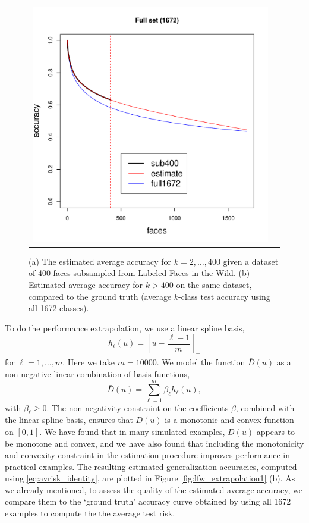 \documentclass[12pt]{article}
\begin{document}
\begin{figure}
\begin{tabular}{cc}
\includegraphics[scale = 0.5]{acc_plot2.pdf}
\end{tabular}
\caption{(a) The estimated average accuracy for $k = 2,\hdots,
  400$ given a dataset of 400 faces subsampled from Labeled Faces in
  the Wild.  (b) Estimated average accuracy for $k > 400$ on the
  same dataset, compared to the ground truth (average $k$-class test accuracy
  using all 1672 classes).}
\label{fig:lfw_extrapolation1}
\end{figure}

To do the performance extrapolation, we use a linear
spline basis,
\[
h_\ell(u) = \left[u - \frac{\ell - 1}{m}\right]_+
\]
for $\ell = 1,\hdots, m$.  Here we take $m = 10000$.  We model the
function $\bar{D}(u)$ as a non-negative linear combination of basis
functions,
\[
\bar{D}(u) = \sum_{\ell = 1}^m \beta_\ell h_\ell(u),
\]
with $\beta_\ell \geq 0$.  The non-negativity constraint on the
coefficients $\beta$, combined with the linear spline basis, ensures
that $\bar{D}(u)$ is a monotonic and convex function on $[0,1]$.  We
have found that in many simulated examples, $D(u)$ appears to be
monotone and convex, and we have also found that including the
monotonicity and convexity constraint in the estimation procedure
improves performance in practical examples.  The resulting estimated
generalization accuracies, computed using \eqref{eq:avrisk_identity},
are plotted in Figure \eqref{fig:lfw_extrapolation1} (b).  As we
already mentioned, to assess the quality of the estimated average
accuracy, we compare them to the `ground truth' accuracy curve
obtained by using all 1672 examples to compute the the average test
risk.
\end{document}
